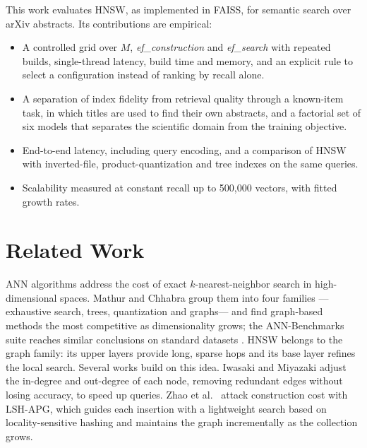 \documentclass[runningheads]{llncs}
\newcommand{\efc}{\textit{ef\_construction}}
\newcommand{\efs}{\textit{ef\_search}}
\begin{document}
This work evaluates HNSW, as implemented in FAISS, for semantic search over arXiv abstracts.
Its contributions are empirical:
\begin{itemize}
\item A controlled grid over $M$, \efc{} and \efs{} with repeated builds, single-thread
latency, build time and memory, and an explicit rule to select a configuration instead of
ranking by recall alone.
\item A separation of index fidelity from retrieval quality through a known-item task, in
which titles are used to find their own abstracts, and a factorial set of six models that
separates the scientific domain from the training objective.
\item End-to-end latency, including query encoding, and a comparison of HNSW with
inverted-file, product-quantization and tree indexes on the same queries.
\item Scalability measured at constant recall up to 500,000 vectors, with fitted growth
rates.
\end{itemize}

\section{Related Work}

ANN algorithms address the cost of exact $k$-nearest-neighbor search in high-dimensional
spaces. Mathur and Chhabra \cite{ref4} group them into four families ---exhaustive search,
trees, quantization and graphs--- and find graph-based methods the most competitive as
dimensionality grows; the ANN-Benchmarks suite reaches similar conclusions on standard
datasets \cite{aumuller2020}. HNSW \cite{ref5} belongs to the graph family: its upper layers
provide long, sparse hops and its base layer refines the local search. Several works build
on this idea. Iwasaki and Miyazaki \cite{ref13} adjust the in-degree and out-degree of each
node, removing redundant edges without losing accuracy, to speed up queries. Zhao et
al.~\cite{ref14} attack construction cost with LSH-APG, which guides each insertion with a
lightweight search based on locality-sensitive hashing and maintains the graph incrementally
as the collection grows.
\end{document}
